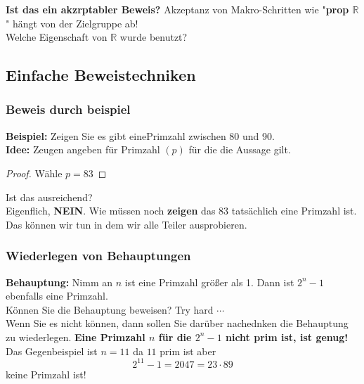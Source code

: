    

\textbf{Ist das ein akzrptabler Beweis?} Akzeptanz von Makro-Schritten wie "\textbf{prop $\mathbb{R}
$}" hängt von der Zielgruppe ab! \\ Welche Eigenschaft von $\mathbb{R}$ wurde benutzt?

\subsection{Einfache Beweistechniken}
\subsubsection{Beweis durch beispiel}
\textbf{Beispiel: } Zeigen Sie es gibt einePrimzahl zwischen 80 und 90.\\ \textbf{Idee: } Zeugen angeben für Primzahl $(p)$ für die die Aussage gilt.
\begin{proof}
    Wähle $p = 83$
\end{proof} 
Ist das ausreichend?\\Eigenflich, \textbf{NEIN}. Wie müssen noch \textbf{zeigen} das 83 tatsächlich eine Primzahl ist. \\Das können wir tun in dem wir alle Teiler ausprobieren. 

\subsubsection{Wiederlegen von Behauptungen} 
\textbf{Behauptung: } Nimm an $n$ ist eine Primzahl größer als 1. Dann ist $2^n - 1$ ebenfalls eine Primzahl. \\Können Sie die Behauptung beweisen? Try hard $\cdots$\\ Wenn Sie es nicht können, dann sollen Sie darüber nachednken die Behauptung zu wiederlegen. \textbf{Eine Primzahl $n$ für die $2^n - 1$ nicht prim ist, ist genug!}\\ Das Gegenbeispiel ist $n = 11$ da $11$ prim ist aber \[2^{11} - 1 = 2047 = 23 \cdot 89\] keine Primzahl ist!

